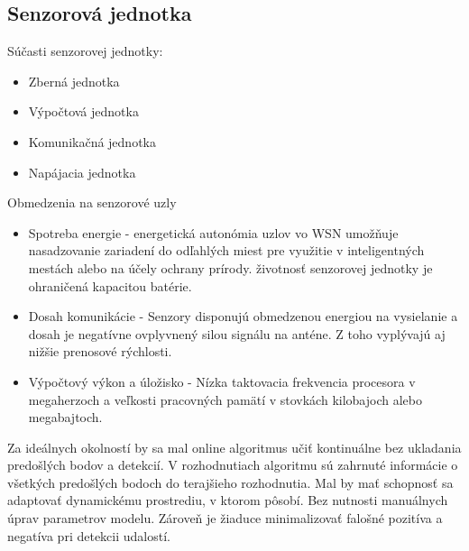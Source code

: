 \subsection{Senzorová jednotka}

Súčasti senzorovej jednotky:
\begin{itemize}
\item Zberná jednotka
\item Výpočtová jednotka
\item Komunikačná jednotka
\item Napájacia jednotka
\end{itemize}

Obmedzenia na senzorové uzly
\begin{itemize}
\item Spotreba energie - energetická autonómia uzlov vo WSN umožňuje nasadzovanie zariadení do odľahlých miest pre využitie v inteligentných mestách alebo na účely ochrany prírody. životnosť senzorovej jednotky je ohraničená kapacitou batérie.
\item Dosah komunikácie - Senzory disponujú obmedzenou energiou na vysielanie a dosah je negatívne ovplyvnený silou signálu na anténe. Z toho vyplývajú aj nižšie prenosové rýchlosti.
\item Výpočtový výkon a úložisko - Nízka taktovacia frekvencia procesora v megaherzoch a veľkosti pracovných pamätí v stovkách kilobajoch alebo megabajtoch.
\end{itemize}
\cite{big-data-collection-wsn}


Za ideálnych okolností by sa mal online algoritmus učiť kontinuálne bez ukladania predošlých bodov a detekcií.
V rozhodnutiach algoritmu sú zahrnuté informácie o všetkých predošlých bodoch do terajšieho rozhodnutia. Mal by mať schopnosť sa adaptovať dynamickému prostrediu, v ktorom pôsobí. Bez nutnosti manuálnych úprav parametrov modelu. Zároveň je žiaduce minimalizovať falošné pozitíva a negatíva pri detekcii udalostí.


\emptypage
